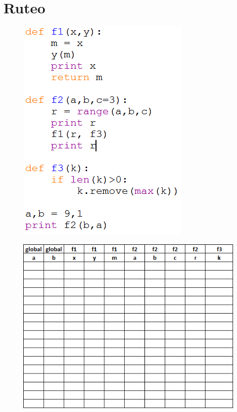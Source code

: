 \section{Ruteo}
\begin{figure}[h]
\centering
    \includegraphics[scale=0.6]{Imagenes/route.png}
\end{figure}
\begin{figure}[h]
\centering
    \includegraphics{Imagenes/planilla.png}
\end{figure}